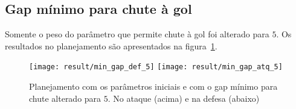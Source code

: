 \subsection{Gap mínimo para chute à gol}
Somente o peso do parâmetro que permite chute à gol
foi alterado para $5$. Os resultados no planejamento são
apresentados na figura~\ref{fig:min_gap_5}.

\begin{figure}[H]
  \centering
  \texttt{[image: result/min\_gap\_def\_5]}
  \texttt{[image: result/min\_gap\_atq\_5]}
  \caption{Planejamento com os parâmetros iniciais e com o gap
           mínimo para chute alterado para $5$.
           No ataque (acima) e na defesa (abaixo)}\label{fig:min_gap_5}
\end{figure}
